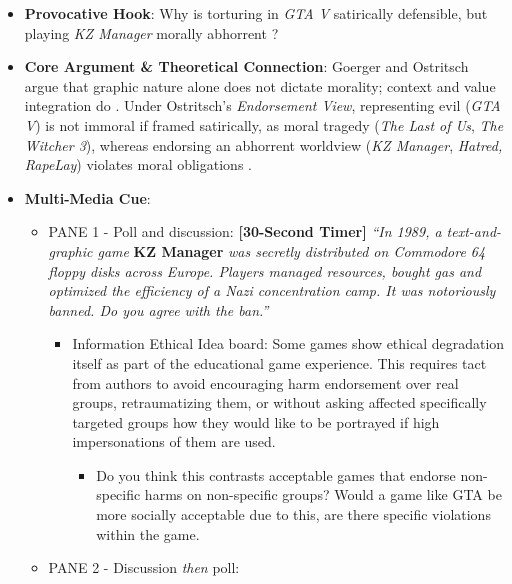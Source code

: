\documentclass[
  a4paper,
  10pt]{article}
\providecommand{\tightlist}{%
  \setlength{\itemsep}{0pt}\setlength{\parskip}{0pt}}
\begin{document}
\begin{itemize}
\item
  \textbf{Provocative Hook}: Why is torturing in \emph{GTA V}
  satirically defensible, but playing \emph{KZ Manager} morally
  abhorrent \autocite{ostritschAmoralistChallengeGaming2017a}?
\item
  \textbf{Core Argument \& Theoretical Connection}: Goerger and
  Ostritsch argue that graphic nature alone does not dictate morality;
  context and value integration do
  \autocite{goergerValueViolenceEthics2017a,ostritschAmoralistChallengeGaming2017a}.
  Under Ostritsch's \emph{Endorsement View}, representing evil
  (\emph{GTA V}) is not immoral if framed satirically, as moral tragedy
  (\emph{The Last of Us}, \emph{The Witcher 3}), whereas endorsing an
  abhorrent worldview (\emph{KZ Manager}, \emph{Hatred, RapeLay})
  violates moral obligations
  \autocite{ostritschAmoralistChallengeGaming2017a}.
\item
  \textbf{Multi-Media Cue}:

  \begin{itemize}
  \item
    PANE 1 - Poll and discussion: \textbf{{[}30-Second Timer{]}}
    \emph{``In 1989, a text-and-graphic game} \textbf{KZ Manager}
    \emph{was secretly distributed on Commodore 64 floppy disks across
    Europe. Players managed resources, bought gas and optimized the
    efficiency of a Nazi concentration camp. It was notoriously banned.
    Do you agree with the ban.''}

    \begin{itemize}
    \item
      Information Ethical Idea board: Some games show ethical
      degradation itself as part of the educational game experience.
      This requires tact from authors to avoid encouraging harm
      endorsement over real groups, retraumatizing them, or without
      asking affected specifically targeted groups how they would like
      to be portrayed if high impersonations of them are used.

      \begin{itemize}
      \tightlist
      \item
        Do you think this contrasts acceptable games that endorse
        non-specific harms on non-specific groups? Would a game like GTA
        be more socially acceptable due to this, are there specific
        violations within the game.
      \end{itemize}
    \end{itemize}
  \item
    PANE 2 - Discussion \emph{then} poll:


\end{itemize}
\end{itemize}
\end{document}

